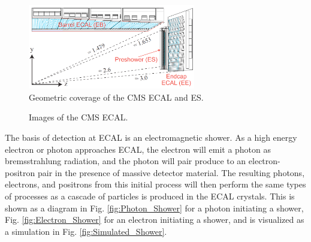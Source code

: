 \begin{figure}[H]
    \centering
    \includegraphics[width=0.65\textwidth]{Images/ECAL/Introduction/ECAL_Diagram.png}    
    \caption{Geometric coverage of the CMS ECAL and ES.}
    \label{fig:ECAL_Geometry}
\end{figure}


\begin{figure}[H]%
    \setcounter{subfigure}{0}
    \centering
    \hfill
    \caption{Images of the CMS ECAL. \label{fig:ECAL_Images}}%
\end{figure}  

The basis of detection at ECAL is an electromagnetic shower. As a high energy electron or photon approaches ECAL, the electron will emit a photon as bremsstrahlung radiation, and the photon will pair produce to an electron-positron pair in the presence of massive detector material. The resulting photons, electrons, and positrons from this initial process will then perform the same types of processes as a cascade of particles is produced in the ECAL crystals. This is shown as a diagram in Fig. \ref{fig:Photon_Shower} for a photon initiating a shower, Fig. \ref{fig:Electron_Shower} for an electron initiating a shower, and is visualized as a simulation in Fig. \ref{fig:Simulated_Shower}. 

